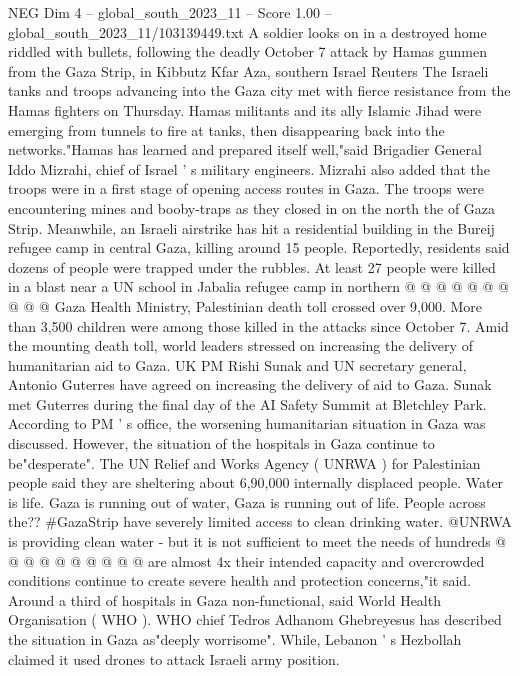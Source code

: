 \begin{textsample}{NEG Dim 4 – global\_south\_2023\_11 – Score 1.00 – global\_south\_2023\_11/103139449.txt}  \label{ex:f4_neg_296}
A soldier looks on in a destroyed home riddled with bullets, following the deadly October 7 attack by Hamas gunmen from the Gaza Strip, in Kibbutz Kfar Aza, southern Israel Reuters The Israeli tanks and troops advancing into the Gaza city met with fierce resistance from the Hamas fighters on Thursday.
Hamas militants and its ally Islamic Jihad were emerging from tunnels to fire at tanks, then disappearing back into the networks."Hamas has learned and prepared itself well,"said Brigadier General Iddo Mizrahi, chief of Israel ' s military engineers.
Mizrahi also added that the troops were in a first stage of opening access routes in Gaza.
The troops were encountering mines and booby-traps as they closed in on the north the of Gaza Strip.
Meanwhile, an Israeli airstrike has hit a residential building in the Bureij refugee camp in central Gaza, killing around 15 people.
Reportedly, residents said dozens of people were trapped under the rubbles.
At least 27 people were killed in a blast near a UN school in Jabalia refugee camp in northern @ @ @ @ @ @ @ @ @ @ Gaza Health Ministry, Palestinian death toll crossed over 9,000.
More than 3,500 children were among those killed in the attacks since October 7.
Amid the mounting death toll, world leaders stressed on increasing the delivery of humanitarian aid to Gaza.
UK PM Rishi Sunak and UN secretary general, Antonio Guterres have agreed on increasing the delivery of aid to Gaza.
Sunak met Guterres during the final day of the AI Safety Summit at Bletchley Park.
According to PM ' s office, the worsening humanitarian situation in Gaza was discussed.
However, the situation of the hospitals in Gaza continue to be"desperate".
The UN Relief and Works Agency ( UNRWA ) for Palestinian people said they are sheltering about 6,90,000 internally displaced people.
Water is life.
Gaza is running out of water, Gaza is running out of life.
People across the?? \#GazaStrip have severely limited access to clean drinking water. @UNRWA is providing clean water - but it is not sufficient to meet the needs of hundreds @ @ @ @ @ @ @ @ @ @ are almost 4x their intended capacity and overcrowded conditions continue to create severe health and protection concerns,"it said.
Around a third of hospitals in Gaza non-functional, said World Health Organisation ( WHO ).
WHO chief Tedros Adhanom Ghebreyesus has described the situation in Gaza as"deeply worrisome".
While, Lebanon ' s Hezbollah claimed it used drones to attack Israeli army position.

\end{textsample}
